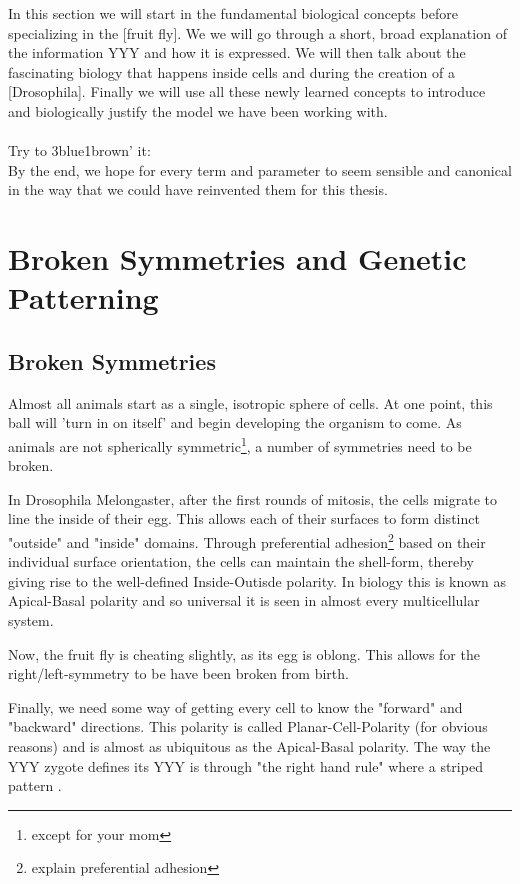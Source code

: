 In this section we will start in the fundamental biological concepts before specializing in the [fruit fly]. We we will go through a short, broad explanation of the information YYY and how it is expressed. We will then talk about the fascinating biology that happens inside cells and during the creation of a [Drosophila]. Finally we will use all these newly learned concepts to introduce and biologically justify the model we have been working with. \\ \\
Try to 3blue1brown' it:\\
By the end, we hope for every term and parameter to seem sensible and canonical in the way that we could have reinvented them for this thesis.


\section{Broken Symmetries and Genetic Patterning}
\label{sec:theory-polarity}
\subsection{Broken Symmetries}

Almost all animals start as a single, isotropic sphere of cells. At one point, this ball will 'turn in on itself' and begin developing the organism to come. As animals are not spherically symmetric\footnote{except for your mom}, a number of symmetries need to be broken. 

In Drosophila Melongaster, after the first rounds of mitosis, the cells migrate to line the inside of their egg. This allows each of their surfaces to form distinct "outside" and "inside" domains. Through preferential adhesion\footnote{explain  preferential adhesion} based on their individual surface orientation, the cells can maintain the shell-form, thereby giving rise to the well-defined Inside-Outisde polarity. In biology this is known as Apical-Basal polarity and so universal it is seen in almost every multicellular system. 

Now, the fruit fly is cheating slightly, as its egg is oblong. This allows for the right/left-symmetry to be have been broken from birth.

Finally, we need some way of getting every cell to know the "forward" and "backward" directions. This polarity is called Planar-Cell-Polarity (for obvious reasons) and is almost as ubiquitous as the Apical-Basal polarity. The way the YYY zygote defines its YYY is through "the right hand rule" where a striped pattern .

